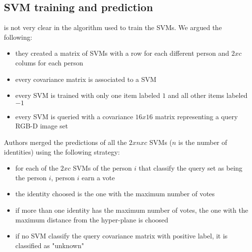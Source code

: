\documentclass[twoside,twocolumn]{article}
\begin{document}
\subsection{SVM training and prediction}
\cite{Hayat2016} is not very clear in the algorithm used to train
the SVMs. We argued the following:
\begin{itemize}
	\item they created a matrix of SVMs with a row for each different person
		and $2xc$ colums for each person
	\item every covariance matrix is associated to a SVM
	\item every SVM is trained with only one item labeled $1$ and all other
		items labeled $-1$
	\item every SVM is queried with a covariance $16x16$ matrix representing
		a query RGB-D image set
\end{itemize}
Authors merged the predictions of all the $2xnxc$ SVMs ($n$ is the number of
identities) using the following strategy:
\begin{itemize}
	\item for each of the $2xc$ SVMs of the person $i$ that classify the
		query set as being the person $i$, person $i$ earn a vote
	\item the identity choosed is the one with the maximum number of votes
	\item if more than one identity has the maximum number of votes, the
		one with the maximum distance from the hyper-plane is choosed
	\item if no SVM classify the query covariance matrix with positive label,
		it is classified as "unknown"
\end{itemize}



\printbibliography
\end{document}
